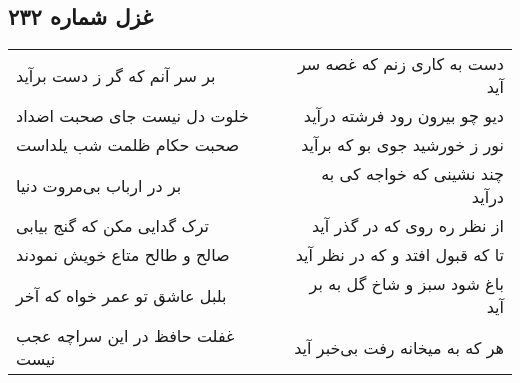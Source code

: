 \begin{center}
\section*{غزل شماره ۲۳۲}
\label{sec:sh232}
\begin{longtable}{l p{0.5cm} r}
بر سر آنم که گر ز دست برآید
&&
دست به کاری زنم که غصه سر آید
\\
خلوت دل نیست جای صحبت اضداد
&&
دیو چو بیرون رود فرشته درآید
\\
صحبت حکام ظلمت شب یلداست
&&
نور ز خورشید جوی بو که برآید
\\
بر در ارباب بی‌مروت دنیا
&&
چند نشینی که خواجه کی به درآید
\\
ترک گدایی مکن که گنج بیابی
&&
از نظر ره روی که در گذر آید
\\
صالح و طالح متاع خویش نمودند
&&
تا که قبول افتد و که در نظر آید
\\
بلبل عاشق تو عمر خواه که آخر
&&
باغ شود سبز و شاخ گل به بر آید
\\
غفلت حافظ در این سراچه عجب نیست
&&
هر که به میخانه رفت بی‌خبر آید
\\
\end{longtable}
\end{center}
